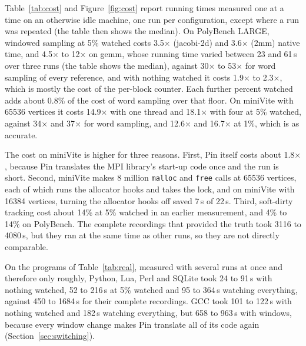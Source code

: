 \documentclass[11pt]{article}
\newcommand{\secref}[1]{Section~\ref{#1}}
\newcommand{\figref}[1]{Figure~\ref{#1}}
\newcommand{\tabref}[1]{Table~\ref{#1}}
\begin{document}
\tabref{tab:cost} and \figref{fig:cost} report running times measured one at a time on an otherwise idle machine, one run per configuration, except where a run was repeated (the table then shows the median). On PolyBench LARGE, windowed sampling at 5\% watched costs 3.5$\times$ (jacobi-2d) and 3.6$\times$ (2mm) native time, and 4.5$\times$ to 12$\times$ on gemm, whose running time varied between 23 and 61\,s over three runs (the table shows the median), against 30$\times$ to 53$\times$ for word sampling of every reference, and with nothing watched it costs 1.9$\times$ to 2.3$\times$, which is mostly the cost of the per-block counter. Each further percent watched adds about 0.8\% of the cost of word sampling over that floor. On miniVite with 65536 vertices it costs 14.9$\times$ with one thread and 18.1$\times$ with four at 5\% watched, against 34$\times$ and 37$\times$ for word sampling, and 12.6$\times$ and 16.7$\times$ at 1\%, which is as accurate.

The cost on miniVite is higher for three reasons. First, Pin itself costs about 1.8$\times$, because Pin translates the MPI library's start-up code once and the run is short. Second, miniVite makes 8 million \texttt{malloc} and \texttt{free} calls at 65536 vertices, each of which runs the allocator hooks and takes the lock, and on miniVite with 16384 vertices, turning the allocator hooks off saved 7\,s of 22\,s. Third, soft-dirty tracking cost about 14\% at 5\% watched in an earlier measurement, and 4\% to 14\% on PolyBench. The complete recordings that provided the truth took 3116 to 4080\,s, but they ran at the same time as other runs, so they are not directly comparable.

On the programs of \tabref{tab:real}, measured with several runs at once and therefore only roughly, Python, Lua, Perl and SQLite took 24 to 91\,s with nothing watched, 52 to 216\,s at 5\% watched and 95 to 364\,s watching everything, against 450 to 1684\,s for their complete recordings. GCC took 101 to 122\,s with nothing watched and 182\,s watching everything, but 658 to 963\,s with windows, because every window change makes Pin translate all of its code again (\secref{sec:switching}).
\end{document}
